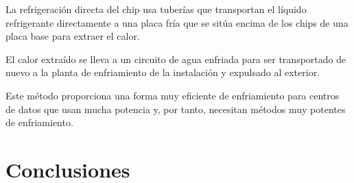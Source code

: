 La refrigeración directa del chip usa tuberías que transportan el líquido refrigerante directamente a una placa fría que se sitúa encima de los chips de una placa base para extraer el calor.

El calor extraído se lleva a un circuito de agua enfriada para ser transportado de nuevo a la planta de enfriamiento de la instalación  y expulsado al exterior.

Este método proporciona una forma muy eficiente de enfriamiento para centros de datos que usan mucha potencia y, por tanto, necesitan métodos muy potentes de enfriamiento.

\chapter{Conclusiones}

















